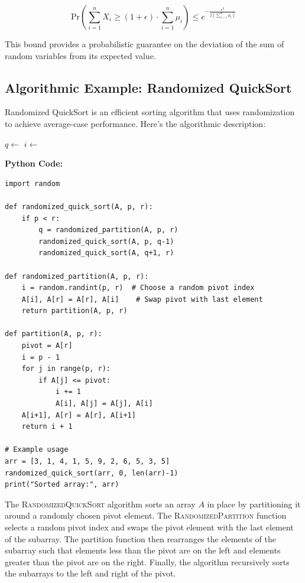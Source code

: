 \documentclass[12pt]{book} %
\begin{document}
\[\text{Pr}\left(\sum_{i=1}^n X_i \geq (1 + \epsilon) \cdot \sum_{i=1}^n \mu_i\right) \leq e^{-\frac{\epsilon^2}{2(\sum_{i=1}^n \mu_i)}}\]

This bound provides a probabilistic guarantee on the deviation of the sum of random variables from its expected value.

\FloatBarrier
\subsection{Algorithmic Example: Randomized QuickSort}

Randomized QuickSort is an efficient sorting algorithm that uses randomization to achieve average-case performance. Here's the algorithmic description:
\FloatBarrier
\begin{algorithm}
\caption{Randomized QuickSort}
\begin{algorithmic}[1]
        \State $q \gets $ 
        \State {}
        \State {}
    \EndIf
\EndFunction
{}
    \State $i \gets$  
    \State {} 
    \State \Return {}
\EndFunction
\end{algorithmic}
\end{algorithm}
\FloatBarrier
\textbf{Python Code:}
\FloatBarrier
\begin{lstlisting}
import random

def randomized_quick_sort(A, p, r):
    if p < r:
        q = randomized_partition(A, p, r)
        randomized_quick_sort(A, p, q-1)
        randomized_quick_sort(A, q+1, r)

def randomized_partition(A, p, r):
    i = random.randint(p, r)  # Choose a random pivot index
    A[i], A[r] = A[r], A[i]    # Swap pivot with last element
    return partition(A, p, r)

def partition(A, p, r):
    pivot = A[r]
    i = p - 1
    for j in range(p, r):
        if A[j] <= pivot:
            i += 1
            A[i], A[j] = A[j], A[i]
    A[i+1], A[r] = A[r], A[i+1]
    return i + 1

# Example usage
arr = [3, 1, 4, 1, 5, 9, 2, 6, 5, 3, 5]
randomized_quick_sort(arr, 0, len(arr)-1)
print("Sorted array:", arr)
\end{lstlisting}
\FloatBarrier
The \textsc{RandomizedQuickSort} algorithm sorts an array \(A\) in place by partitioning it around a randomly chosen pivot element. The \textsc{RandomizedPartition} function selects a random pivot index and swaps the pivot element with the last element of the subarray. The partition function then rearranges the elements of the subarray such that elements less than the pivot are on the left and elements greater than the pivot are on the right. Finally, the algorithm recursively sorts the subarrays to the left and right of the pivot.
\end{document}

